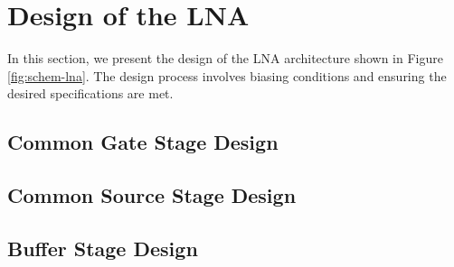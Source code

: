 \section{Design of the LNA}

In this section, we present the design of the LNA architecture shown in Figure \ref{fig:schem-lna}. The design process involves biasing conditions and ensuring the desired specifications are met.

\subsection{Common Gate Stage Design}

\subsection{Common Source Stage Design}

\subsection{Buffer Stage Design}